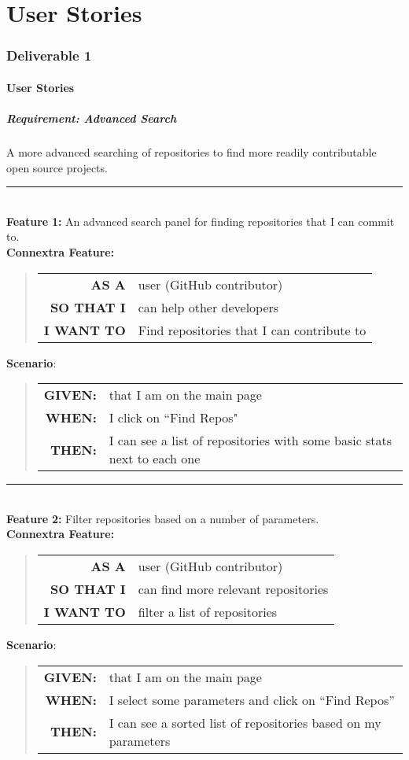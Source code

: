 \documentclass[12pt]{article}
\newcommand{\Feature}[1]{ 
   \noindent \textbf{Feature} #1
}
\newcommand{\CFeature}[4]{
\noindent \textbf{Connextra Feature:}
	\begin{quote}
	\begin{tabular}{rl}
	\textbf{AS A} & #1\\
	\textbf{SO THAT \uppercase{#2}} & #3\\
	\textbf{\uppercase{#2} WANT TO} & #4  
	\end{tabular}
	\end{quote}
}
\newcommand{\GivenSc} {
	\noindent \textbf{GIVEN:}
	}
\newcommand{\WhenSc} {
	\noindent \textbf{WHEN:}
	}
\newcommand{\AndSc} {
	\noindent \textbf{AND:}
	}
\newcommand{\ThenSc} {
	\noindent \textbf{THEN:}
	}
\begin{document}


\pagebreak
\setcounter{part}{1}
\setcounter{section}{1}
\setcounter{subsection}{0}
\part{User Stories}
\section*{Deliverable 1}
\subsection{User Stories}


\begin{framed}
\subsubsection{Requirement: Advanced Search}
\noindent A more advanced searching of repositories to find more readily contributable open source projects.\\[0.2cm]

\hrule~\\

\noindent\Feature{\textbf{1:} An advanced search panel for finding repositories that I can commit to.}\\[0.2cm]


\CFeature{user (\textsf{GitHub} contributor)}{I}{can help other developers}{Find repositories that I can contribute to}

\noindent \textbf{Scenario}:
\begin{quote}
\begin{tabular}{rl}
\GivenSc & that I am on the main page\\
\WhenSc & I click on ``Find Repos"\\
\ThenSc & I can see a list of repositories with some basic stats next to each one
\end{tabular}
\end{quote}

\hrule~\\

\noindent\Feature{\textbf{2:} Filter repositories based on a number of parameters.}\\[0.2cm]

\CFeature{user (\textsf{GitHub} contributor)}{I}{can find more relevant repositories}{filter a list of repositories}

\noindent \textbf{Scenario}:
\begin{quote}
\begin{tabular}{rl}
\GivenSc & that I am on the main page\\
\WhenSc & I select some parameters and click on ``Find Repos''\\
\ThenSc & I can see a sorted list of repositories based on my parameters
\end{tabular}
\end{quote}
\end{framed}
\end{document}
